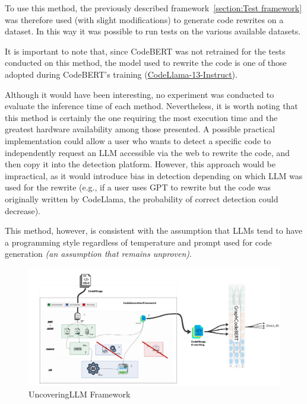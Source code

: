 To use this method, the previously described framework~\ref{section:Test framework} 
was therefore used (with slight modifications) to generate code rewrites on a 
dataset. In this way it was possible to run tests on the various available datasets.

It is important to note that, since CodeBERT was not retrained for the tests 
conducted on this method, the model used to rewrite the code is one of those 
adopted during CodeBERT’s training 
(\href{https://huggingface.co/codellama/CodeLlama-13b-Instruct-hf}{CodeLlama-13-Instruct}\cite{roziere2023code}).

Although it would have been interesting, no experiment was conducted to evaluate 
the inference time of each method. Nevertheless, it is worth noting that this method 
is certainly the one requiring the most execution time and the greatest hardware 
availability among those presented. A possible practical implementation could allow 
a user who wants to detect a specific code to independently request an LLM accessible 
via the web to rewrite the code, and then copy it into the detection platform. 
However, this approach would be impractical, as it would introduce bias in detection 
depending on which LLM was used for the rewrite (e.g., if a user uses GPT to rewrite 
but the code was originally written by CodeLlama, the probability of correct detection 
could decrease).

This method, however, is consistent with the assumption that LLMs tend to have a 
programming style regardless of temperature and prompt used for code generation \textit{(an 
assumption that remains unproven)}.

\begin{figure}[H]
    \centering
    \includegraphics[width=1\textwidth]{img/UncoveringLLM/framework.jpg}
    \caption{UncoveringLLM Framework}
    \label{fig:UncoveringLLM Framework}
\end{figure}



